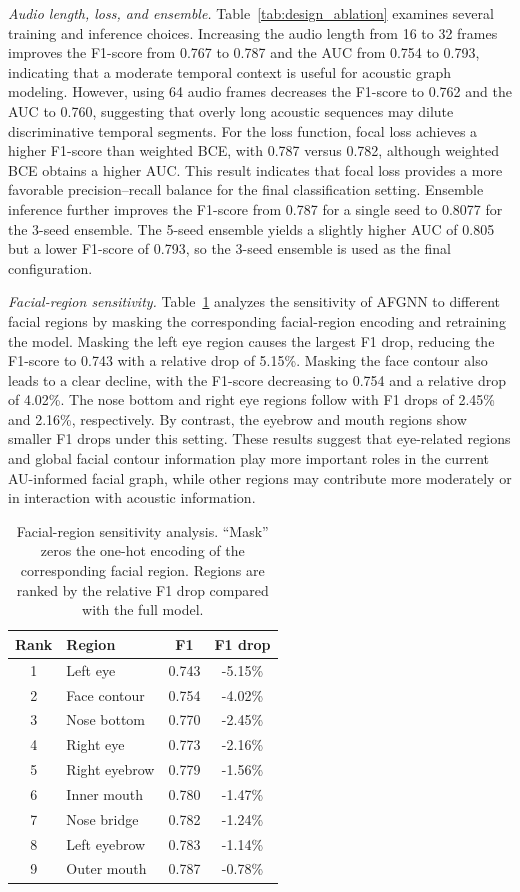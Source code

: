 \documentclass[conference]{IEEEtran}
\begin{document}
\textit{Audio length, loss, and ensemble.}
Table~\ref{tab:design_ablation} examines several training and inference choices. Increasing the audio length from 16 to 32 frames improves the F1-score from 0.767 to 0.787 and the AUC from 0.754 to 0.793, indicating that a moderate temporal context is useful for acoustic graph modeling. However, using 64 audio frames decreases the F1-score to 0.762 and the AUC to 0.760, suggesting that overly long acoustic sequences may dilute discriminative temporal segments. For the loss function, focal loss achieves a higher F1-score than weighted BCE, with 0.787 versus 0.782, although weighted BCE obtains a higher AUC. This result indicates that focal loss provides a more favorable precision--recall balance for the final classification setting. Ensemble inference further improves the F1-score from 0.787 for a single seed to 0.8077 for the 3-seed ensemble. The 5-seed ensemble yields a slightly higher AUC of 0.805 but a lower F1-score of 0.793, so the 3-seed ensemble is used as the final configuration.



\textit{Facial-region sensitivity.}
Table~\ref{tab:region_ablation} analyzes the sensitivity of AFGNN to different facial regions by masking the corresponding facial-region encoding and retraining the model. Masking the left eye region causes the largest F1 drop, reducing the F1-score to 0.743 with a relative drop of 5.15\%. Masking the face contour also leads to a clear decline, with the F1-score decreasing to 0.754 and a relative drop of 4.02\%. The nose bottom and right eye regions follow with F1 drops of 2.45\% and 2.16\%, respectively. By contrast, the eyebrow and mouth regions show smaller F1 drops under this setting. These results suggest that eye-related regions and global facial contour information play more important roles in the current AU-informed facial graph, while other regions may contribute more moderately or in interaction with acoustic information.


\begin{table}[htb]
\centering
\caption{Facial-region sensitivity analysis. ``Mask'' zeros the one-hot encoding of the corresponding facial region. Regions are ranked by the relative F1 drop compared with the full model.}
\label{tab:region_ablation}
\small
\setlength{\tabcolsep}{6pt}
\begin{tabular}{clcc}
\toprule[1.0pt]
Rank & Region & F1 & F1 drop \\
\midrule[0.8pt]
1 & Left eye & 0.743 & -5.15\% \\
2 & Face contour & 0.754 & -4.02\% \\
3 & Nose bottom & 0.770 & -2.45\% \\
4 & Right eye & 0.773 & -2.16\% \\
5 & Right eyebrow & 0.779 & -1.56\% \\
6 & Inner mouth & 0.780 & -1.47\% \\
7 & Nose bridge & 0.782 & -1.24\% \\
8 & Left eyebrow & 0.783 & -1.14\% \\
9 & Outer mouth & 0.787 & -0.78\% \\
\bottomrule[1.0pt]
\end{tabular}
\end{table}
\end{document}
